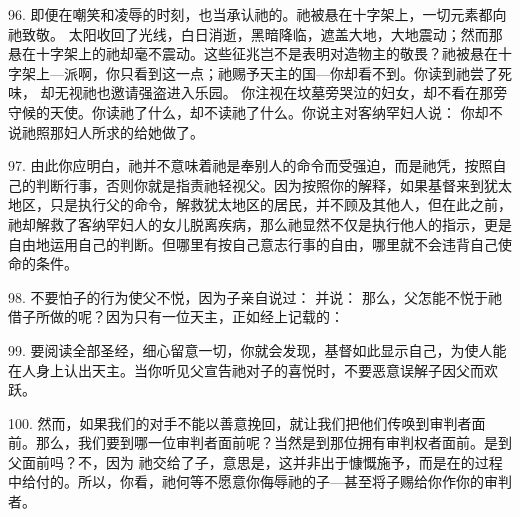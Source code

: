 96. 即便在嘲笑和凌辱的时刻，也当承认祂的。祂被悬在十字架上，一切元素都向祂致敬。 太阳收回了光线，白日消逝，黑暗降临，遮盖大地，大地震动；然而那悬在十字架上的祂却毫不震动。这些征兆岂不是表明对造物主的敬畏？祂被悬在十字架上---派啊，你只看到这一点；祂赐予天主的国---你却看不到。你读到祂尝了死味， 却无视祂也邀请强盗进入乐园。 你注视在坟墓旁哭泣的妇女，却不看在那旁守候的天使。你读祂了什么，却不读祂了什么。你说主对客纳罕妇人说： 你却不说祂照那妇人所求的给她做了。\par

97. 由此你应明白，祂并不意味着祂是奉别人的命令而受强迫，而是祂凭，按照自己的判断行事，否则你就是指责祂轻视父。因为按照你的解释，如果基督来到犹太地区，只是执行父的命令，解救犹太地区的居民，并不顾及其他人，但在此之前，祂却解救了客纳罕妇人的女儿脱离疾病，那么祂显然不仅是执行他人的指示，更是自由地运用自己的判断。但哪里有按自己意志行事的自由，哪里就不会违背自己使命的条件。\par

98. 不要怕子的行为使父不悦，因为子亲自说过： 并说： 那么，父怎能不悦于祂借子所做的呢？因为只有一位天主，正如经上记载的：\par

99. 要阅读全部圣经，细心留意一切，你就会发现，基督如此显示自己，为使人能在人身上认出天主。当你听见父宣告祂对子的喜悦时，不要恶意误解子因父而欢跃。\par

\par

100. 然而，如果我们的对手不能以善意挽回，就让我们把他们传唤到审判者面前。那么，我们要到哪一位审判者面前呢？当然是到那位拥有审判权者面前。是到父面前吗？不，因为 祂交给了子，意思是，这并非出于慷慨施予，而是在的过程中给付的。所以，你看，祂何等不愿意你侮辱祂的子---甚至将子赐给你作你的审判者。\par

